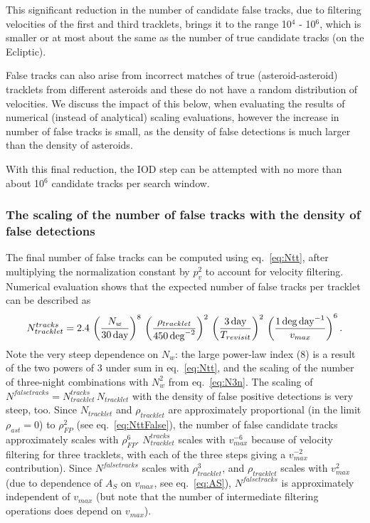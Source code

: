 This significant reduction in the number of candidate false tracks, due to filtering velocities
of the first and third tracklets, brings it to the range 10$^{4}$ - 10$^{6}$, which is smaller or at
most about the same as the number of true candidate tracks (on the Ecliptic). 

False tracks can also arise from incorrect matches of true (asteroid-asteroid) tracklets 
from different asteroids and these do not have a random distribution
of velocities. We discuss the impact of this below, when evaluating the results 
of numerical (instead of analytical) scaling evaluations, however the increase in
number of false tracks is small, as the density of false detections is much larger than
the density of asteroids.

With this final
reduction, the IOD step can be attempted with no more than about 10$^6$ candidate tracks per
search window.



\subsubsection{The scaling of the number of false tracks with the density of false detections}

The final number of false tracks can be computed using eq.~\ref{eq:Ntt}, after multiplying
the normalization constant by $p_v^2$ to account for velocity filtering. Numerical evaluation
shows that the expected number of false tracks per tracklet can be described as
\begin{equation}
\label{eq:NttFinalFit}
   N_{tracklet}^{tracks} = 2.4 \, \left({N_w\over 30\, {\rm day}}\right)^8 \, \left( \rho_{tracklet}  \over 450
        \, {\rm deg}^{-2} \right)^2 \, \left( {3\,{\rm day} \over T_{revisit}} \right)^2 \,
         \left( {1 \, {\rm deg} \, {\rm day}^{-1}  \over  v_{max} }\right)^6.
\end{equation}
Note the very steep dependence on $N_w$: the large power-law index (8) is a result of the two
powers of 3 under sum in eq.~\ref{eq:Ntt}, and the scaling of the number of three-night
combinations with $N_w^2$ from eq.~\ref{eq:N3n}. The scaling of $N^{falsetracks} = N_{tracklet}^{tracks} \, N_{tracklet}$
with the density of false positive detections is very steep, too. Since $N_{tracklet}$ and $\rho_{tracklet}$
are approximately proportional (in the limit $\rho_{ast}=0$) to $\rho_{FP}^2$ (see eq.~\ref{eq:NttFalse}),
the number of false candidate tracks approximately scales with $\rho_{FP}^6$. 
$N_{tracklet}^{tracks}$ scales with $v_{max}^{-6}$ because of velocity filtering for three tracklets,
with each of the three steps giving a $v_{max}^{-2}$ contribution). 
Since $N^{falsetracks}$ scales with $\rho_{tracklet}^3$, and $\rho_{tracklet}$ scales with $v_{max}^2$
(due to dependence of $A_S$ on $v_{max}$, see eq.~\ref{eq:AS}), $N^{falsetracks}$ is approximately 
independent of $v_{max}$ (but note that the number of intermediate filtering operations does 
depend on $v_{max}$). 

